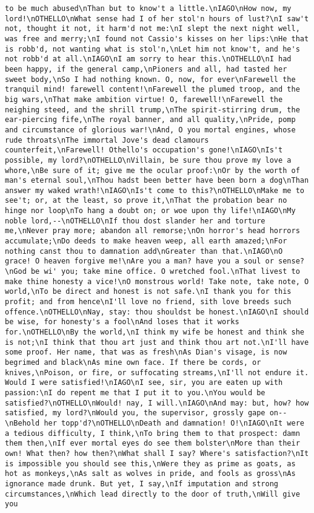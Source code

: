 \begin{verbatim}
to be much abused\nThan but to know't a little.\nIAGO\nHow now, my lord!\nOTHELLO\nWhat sense had I of her stol'n hours of lust?\nI saw't not, thought it not, it harm'd not me:\nI slept the next night well, was free and merry;\nI found not Cassio's kisses on her lips:\nHe that is robb'd, not wanting what is stol'n,\nLet him not know't, and he's not robb'd at all.\nIAGO\nI am sorry to hear this.\nOTHELLO\nI had been happy, if the general camp,\nPioners and all, had tasted her sweet body,\nSo I had nothing known. O, now, for ever\nFarewell the tranquil mind! farewell content!\nFarewell the plumed troop, and the big wars,\nThat make ambition virtue! O, farewell!\nFarewell the neighing steed, and the shrill trump,\nThe spirit-stirring drum, the ear-piercing fife,\nThe royal banner, and all quality,\nPride, pomp and circumstance of glorious war!\nAnd, O you mortal engines, whose rude throats\nThe immortal Jove's dead clamours counterfeit,\nFarewell! Othello's occupation's gone!\nIAGO\nIs't possible, my lord?\nOTHELLO\nVillain, be sure thou prove my love a whore,\nBe sure of it; give me the ocular proof:\nOr by the worth of man's eternal soul,\nThou hadst been better have been born a dog\nThan answer my waked wrath!\nIAGO\nIs't come to this?\nOTHELLO\nMake me to see't; or, at the least, so prove it,\nThat the probation bear no hinge nor loop\nTo hang a doubt on; or woe upon thy life!\nIAGO\nMy noble lord,--\nOTHELLO\nIf thou dost slander her and torture me,\nNever pray more; abandon all remorse;\nOn horror's head horrors accumulate;\nDo deeds to make heaven weep, all earth amazed;\nFor nothing canst thou to damnation add\nGreater than that.\nIAGO\nO grace! O heaven forgive me!\nAre you a man? have you a soul or sense?\nGod be wi' you; take mine office. O wretched fool.\nThat livest to make thine honesty a vice!\nO monstrous world! Take note, take note, O world,\nTo be direct and honest is not safe.\nI thank you for this profit; and from hence\nI'll love no friend, sith love breeds such offence.\nOTHELLO\nNay, stay: thou shouldst be honest.\nIAGO\nI should be wise, for honesty's a fool\nAnd loses that it works for.\nOTHELLO\nBy the world,\nI think my wife be honest and think she is not;\nI think that thou art just and think thou art not.\nI'll have some proof. Her name, that was as fresh\nAs Dian's visage, is now begrimed and black\nAs mine own face. If there be cords, or knives,\nPoison, or fire, or suffocating streams,\nI'll not endure it. Would I were satisfied!\nIAGO\nI see, sir, you are eaten up with passion:\nI do repent me that I put it to you.\nYou would be satisfied?\nOTHELLO\nWould! nay, I will.\nIAGO\nAnd may: but, how? how satisfied, my lord?\nWould you, the supervisor, grossly gape on--\nBehold her topp'd?\nOTHELLO\nDeath and damnation! O!\nIAGO\nIt were a tedious difficulty, I think,\nTo bring them to that prospect: damn them then,\nIf ever mortal eyes do see them bolster\nMore than their own! What then? how then?\nWhat shall I say? Where's satisfaction?\nIt is impossible you should see this,\nWere they as prime as goats, as hot as monkeys,\nAs salt as wolves in pride, and fools as gross\nAs ignorance made drunk. But yet, I say,\nIf imputation and strong circumstances,\nWhich lead directly to the door of truth,\nWill give you 
\end{verbatim}
